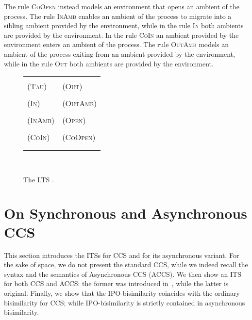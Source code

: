\documentclass[copyright,creativecommons]{eptcs}
\newcommand{\<}{\langle}
\renewcommand{\>}{\rangle}
\begin{document}
The rule \textsc{CoOpen} instead models an environment that opens an
ambient of the process.  The rule \textsc{InAmb} enables an ambient of
the process to migrate into a sibling ambient provided by the
environment, while in the rule \textsc{In} both ambients are provided
by the environment. In the rule \textsc{CoIn} an ambient provided by
the environment enters an ambient of the process. The rule
\textsc{OutAmb} models an ambient of the process exiting from an
ambient provided by the environment, while in the rule \textsc{Out}
both ambients are provided by the environment.

\begin{figure}[!t]
\begin{center}
\begin{tabular}{p{6.5 cm} p{6 cm}}
\hline \\
\textsc{\scriptsize(Tau)}

& \textsc{\scriptsize (Out)}

\\ \\
\textsc{\scriptsize(In)}

& \textsc{\scriptsize(OutAmb)} 
\\ \\
\textsc{\scriptsize (InAmb)}

& \textsc{\scriptsize(Open)} 
\\ \\
\textsc{\scriptsize (CoIn)}

& \textsc{\scriptsize (CoOpen)} \\ \\
\hline \\
\end{tabular} \\
\caption{The LTS .} \label{TableLTSProc2}
\end{center}
\end{figure}












\section{On Synchronous and Asynchronous CCS}\label{sec:CCS}
This section introduces the ITSs for CCS and for its asynchronous
variant.  For the sake of space, we do not present the standard CCS,
while we indeed recall the syntax and the semantics of Asynchronous
CCS (ACCS). We then show an ITS for both CCS and ACCS: the former was
introduced in~\cite{bgk:bisimulation-graph-enc}, while the latter is
original. Finally, we show that the IPO-bisimilarity coincides with
the ordinary bisimilarity for CCS; while IPO-bisimilarity is strictly
contained in asynchronous bisimilarity.
\end{document}
